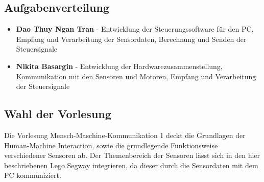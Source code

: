 \documentclass[german,11pt,a4paper]{netforms}
\begin{document}
\subsection*{Aufgabenverteilung}
\begin{itemize}
\item \textbf{Dao Thuy Ngan Tran} - Entwicklung der Steuerungssoftware für den PC, Empfang und Verarbeitung der Sensordaten, Berechnung und Senden der Steuersignale
\item \textbf{Nikita Basargin} - Entwicklung der Hardwarezusammenstellung, Kommunikation mit den Sensoren und Motoren, Empfang und Verarbeitung der Steuersignale
\end{itemize}

\subsection*{Wahl der Vorlesung}
Die Vorlesung Mensch-Maschine-Kommunikation 1 deckt die Grundlagen der Human-Machine Interaction, sowie die grundlegende Funktionsweise verschiedener Sensoren ab. Der Themenbereich der Sensoren lässt sich in den hier beschriebenen Lego Segway integrieren, da dieser durch die Sensordaten mit dem PC kommuniziert.
\end{document}
